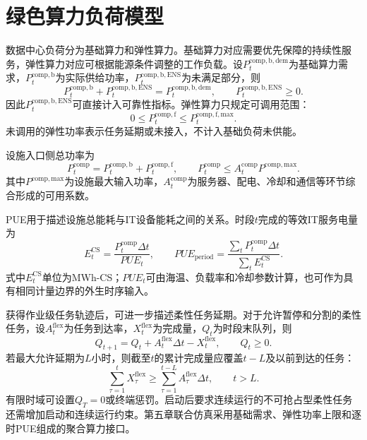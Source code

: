 \section{绿色算力负荷模型}
\label{sec:compute}

数据中心负荷分为基础算力和弹性算力。基础算力对应需要优先保障的持续性服务，弹性算力对应可根据能源条件调整的工作负载。设$P_t^{\mathrm{comp,b,dem}}$为基础算力需求，$P_t^{\mathrm{comp,b}}$为实际供给功率，$P_t^{\mathrm{comp,b,ENS}}$为未满足部分，则
\begin{equation}
P_t^{\mathrm{comp,b}}+P_t^{\mathrm{comp,b,ENS}}
=P_t^{\mathrm{comp,b,dem}},
\qquad P_t^{\mathrm{comp,b,ENS}}\ge0.
\label{eq:dc-rigid}
\end{equation}
因此$P_t^{\mathrm{comp,b,ENS}}$可直接计入可靠性指标。弹性算力只规定可调用范围：
\begin{equation}
0\le P_t^{\mathrm{comp,f}}\le P_t^{\mathrm{comp,f,max}}.
\label{eq:dc-spot}
\end{equation}
未调用的弹性功率表示任务延期或未接入，不计入基础负荷未供能。

设施入口侧总功率为
\begin{equation}
P_t^{\mathrm{comp}}
=P_t^{\mathrm{comp,b}}+P_t^{\mathrm{comp,f}},
\qquad
P_t^{\mathrm{comp}}\le A_t^{\mathrm{comp}}P^{\mathrm{comp,max}}.
\label{eq:dc-capacity-fiber}
\end{equation}
其中$P^{\mathrm{comp,max}}$为设施最大输入功率，$A_t^{\mathrm{comp}}$为服务器、配电、冷却和通信等环节综合形成的可用系数。

PUE用于描述设施总能耗与IT设备能耗之间的关系。时段$t$完成的等效IT服务电量为
\begin{equation}
E_t^{\mathrm{CS}}
=\frac{P_t^{\mathrm{comp}}\Delta t}{PUE_t},
\qquad
PUE_{\mathrm{period}}
=\frac{\sum_tP_t^{\mathrm{comp}}\Delta t}
{\sum_tE_t^{\mathrm{CS}}}.
\label{eq:dc-it-energy}
\end{equation}
式中$E_t^{\mathrm{CS}}$单位为MWh-CS；$PUE_t$可由海温、负载率和冷却参数计算，也可作为具有相同计量边界的外生时序输入。

获得作业级任务轨迹后，可进一步描述柔性任务延期。对于允许暂停和分割的柔性任务，设$A_t^{\mathrm{flex}}$为任务到达率，$X_t^{\mathrm{flex}}$为完成量，$Q_t$为时段末队列，则
\begin{equation}
Q_{t+1}=Q_t+A_t^{\mathrm{flex}}\Delta t-X_t^{\mathrm{flex}},
\qquad Q_t\ge0.
\label{eq:dc-queue}
\end{equation}
若最大允许延期为$L$小时，则截至$t$的累计完成量应覆盖$t-L$及以前到达的任务：
\begin{equation}
\sum_{\tau=1}^{t}X_\tau^{\mathrm{flex}}
\ge
\sum_{\tau=1}^{t-L}A_\tau^{\mathrm{flex}}\Delta t,
\qquad t>L.
\label{eq:dc-overdue}
\end{equation}
有限时域可设置$Q_T=0$或终端惩罚。启动后要求连续运行的不可抢占型柔性任务还需增加启动和连续运行约束。第五章联合仿真采用基础需求、弹性功率上限和逐时PUE组成的聚合算力接口。

